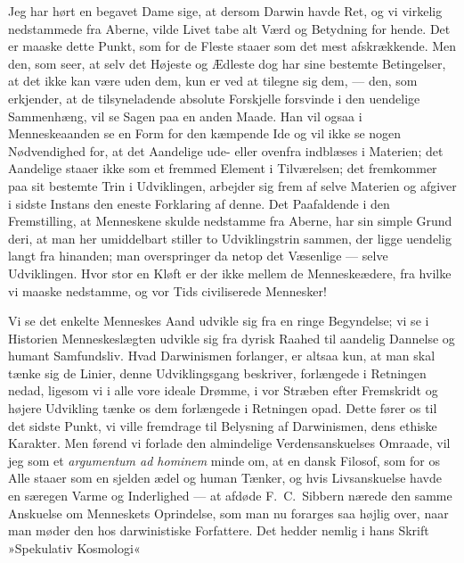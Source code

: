 \documentclass[12pt,a4paper]{article}
\begin{document}
Jeg har hørt en begavet Dame sige, at dersom Darwin havde Ret, og vi
virkelig nedstammede fra Aberne, vilde Livet tabe alt Værd og Betydning
for hende. Det er maaske dette Punkt, som for de Fleste staaer som det
mest afskrækkende. Men den, som seer, at selv det Højeste og Ædleste dog
har sine bestemte Betingelser, at det ikke kan være uden dem, kun er ved
at tilegne sig dem, --- den, som erkjender, at de tilsyneladende absolute
Forskjelle forsvinde i den uendelige Sammenhæng, vil se Sagen paa en
anden Maade. Han vil ogsaa i Menneskeaanden se en Form for den kæmpende
Ide og vil ikke se nogen Nødvendighed for, at det Aandelige ude- eller
ovenfra indblæses i Materien; det Aandelige staaer ikke som et fremmed
Element i Tilværelsen; det fremkommer paa sit bestemte Trin i
Udviklingen, arbejder sig frem af selve Materien og afgiver i sidste
Instans den eneste Forklaring af denne. Det Paafaldende i den
Fremstilling, at Menneskene skulde nedstamme fra Aberne, har sin simple
Grund deri, at man her umiddelbart stiller to Udviklingstrin sammen, der
ligge uendelig langt fra hinanden; man overspringer da netop det
Væsenlige --- selve Udviklingen. Hvor stor en Kløft er der ikke mellem
de Menneskeædere, fra hvilke vi maaske nedstamme, og vor Tids
civiliserede Mennesker!

Vi se det enkelte Menneskes Aand udvikle sig fra en ringe Begyndelse; vi
se i Historien Menneskeslægten udvikle sig fra dyrisk Raahed til aandelig
Dannelse og humant Samfundsliv. Hvad Darwinismen forlanger, er altsaa
kun, at man skal tænke sig de Linier, denne Udviklingsgang beskriver,
forlængede i Retningen nedad, ligesom vi i alle vore ideale Drømme, i
vor Stræben efter Fremskridt og højere Udvikling tænke os dem forlængede
i Retningen opad. Dette fører os til det sidste Punkt, vi ville fremdrage
til Belysning af Darwinismen, dens ethiske Karakter. Men førend vi
forlade den almindelige Verdensanskuelses Omraade, vil jeg som et
\textit{argumentum ad hominem} minde om, at en dansk Filosof, som for os
Alle staaer som en sjelden ædel og human Tænker, og hvis Livsanskuelse
havde en særegen Varme og Inderlighed --- at afdøde F.\ C.\ Sibbern
nærede den samme Anskuelse om Menneskets Oprindelse, som man nu forarges
saa højlig over, naar man møder den hos darwinistiske Forfattere. Det
hedder nemlig i hans Skrift »Spekulativ Kosmologi«

\end{document}
